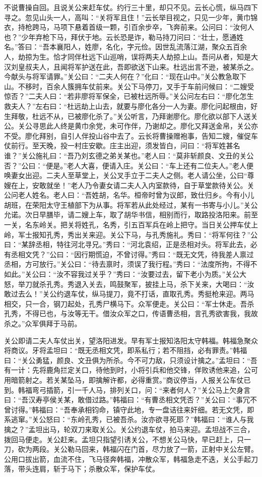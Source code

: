 不说曹操自回。且说关公来赶车仗。约行三十里，却只不见。云长心慌，纵马四下寻之。忽见山头一人，高叫：“关将军且住！”云长举目视之，只见一少年，黄巾锦衣，持枪跨马，马项下悬着首级一颗，引百余步卒，飞奔前来。公问曰：“汝何人也？”少年弃枪下马，拜伏于地。云长恐是诈，勒马持刀问曰：“壮士，愿通姓名。”答曰：“吾本襄阳人，姓廖，名化，字元俭。因世乱流落江湖，聚众五百余人，劫掠为生。恰才同伴杜远下山巡哨，误将两夫人劫掠上山。吾问从者，知是大汉刘皇叔夫人，且闻将军护送在此，吾即欲送下山来。杜远出言不逊，被某杀之。今献头与将军请罪。”关公曰：“二夫人何在？”化曰：“现在山中。”关公教急取下山。不移时，百余人簇拥车仗前来。关公下马停刀，叉手于车前问候曰：“二嫂受惊否？”二夫人曰：“若非廖将军保全，已被杜远所辱。”关公问左右曰：“廖化怎生救夫人？”左右曰：“杜远劫上山去，就要与廖化各分一人为妻。廖化问起根由，好生拜敬，杜远不从，已被廖化杀了。”关公听言，乃拜谢廖化。廖化欲以部下人送关公。关公寻思此人终是黄巾余党，未可作伴，乃谢却之。廖化又拜送金帛，关公亦不受。廖化拜别，自引人伴投山谷中去了。云长将曹操赠袍事，告知二嫂，催促车仗前行。至天晚，投一村庄安歇。庄主出迎，须发皆白，问曰：“将军姓甚名谁？”关公施礼曰：“吾乃刘玄德之弟关某也。”老人曰：“莫非斩颜良、文丑的关公否？”公曰：“便是。”老人大喜，便请入庄。关公曰：“车上还有二位夫人。”老人便唤妻女出迎。二夫人至草堂上，关公叉手立于二夫人之侧。老人请公坐，公曰“尊嫂在上，安敢就坐！”老人乃令妻女请二夫人入内室款待，自于草堂款待关公。关公问老人姓名。老人曰：“吾姓胡，名华。桓帝时曾为议郎，致仕归乡。今有小儿胡班，在荣阳太守王植部下为从事。将军若从此处经过，某有一书寄与小儿。”关公允诺。次日早膳毕，请二嫂上车，取了胡华书信，相别而行，取路投洛阳来。前至一关，名东岭关。把关将姓孔，名秀，引五百军兵在岭上把守。当日关公押车仗上岭，军士报知孔秀，秀出关来迎。关公下马，与孔秀施礼。秀曰：“将军何往？”公曰：“某辞丞相，特往河北寻兄。”秀曰：“河北袁绍，正是丞相对头。将军此去，必有丞相文凭？”公曰：“因行期慌迫，不曾讨得。”秀曰：“既无文凭，待我差人禀过丞相，方可放行。”关公曰：“待去禀时，须误了我行程。”秀曰：“法度所拘，不得不如此。”关公曰：“汝不容我过关乎？”秀曰：“汝要过去，留下老小为质。”关公大怒，举刀就杀孔秀。秀退入关去，鸣鼓聚军，披挂上马，杀下关来，大喝曰：“汝敢过去么！”关公约退车仗，纵马提刀，竟不打话，直取孔秀。秀挺枪来迎。两马相交，只一合，钢刀起处，孔秀尸横马下。众军便走。关公曰：“军士休走。吾杀孔秀，不得已也，与汝等无干。借汝众军之口，传语曹丞相，言孔秀欲害我，我故杀之。”众军俱拜于马前。

关公即请二夫人车仗出关，望洛阳进发。早有军士报知洛阳太守韩福。韩福急聚众将商议。牙将孟坦曰：“既无丞相文凭，即系私行；若不阻挡，必有罪责。”韩福曰：“关公勇猛，颜良、文丑俱为所杀。今不可力敌，只须设计擒之。”孟坦曰：“吾有一计：先将鹿角拦定关口，待他到时，小将引兵和他交锋，佯败诱他来追，公可用暗箭射之。若关某坠马，即擒解许都，必得重赏。”商议停当，人报关公车仗已到。韩福弯弓插箭，引一千人马，排列关口，问：“来者何人？”关公马上欠身言曰：“吾汉寿亭侯关某，敢借过路。”韩福曰：“有曹丞相文凭否？”关公曰：“事冗不曾讨得。”韩福曰：“吾奉承相钧命，镇守此地，专一盘诘往来奸细。若无文凭，即系逃窜。”关公怒曰：“东岭孔秀，已被吾杀。汝亦欲寻死耶？”韩福曰：“谁人与我擒之？”孟坦出马，轮双刀来取关公。关公约退车仗，拍马来迎。孟坦战不三合，拨回马便走。关公赶来。孟坦只指望引诱关公，不想关公马快，早已赶上，只一刀，砍为两段。关公勒马回来，韩福闪在门首，尽力放了一箭，正射中关公左臂。公用口拔出箭，血流不住，飞马径奔韩福，冲散众军，韩福急走不迭，关公手起刀落，带头连肩，斩于马下；杀散众军，保护车仗。


